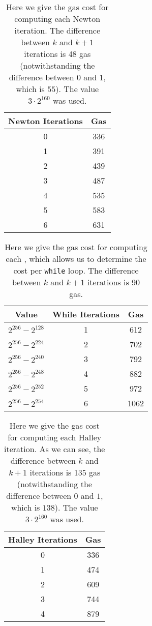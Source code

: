 \begin{table}[p]
\centering
\begin{tabular}{|c|S[table-format=3.0]|}
\hline
Newton Iterations & Gas \\
 & 336 \\
1 & 391 \\
2 & 439 \\
3 & 487 \\
4 & 535 \\
5 & 583 \\
6 & 631 \\
\hline
\end{tabular}
\caption[Newton Iteration Gas Costs]{Here we give
    the gas cost for computing each Newton iteration.
    The difference between $k$ and $k+1$ iterations is 48 gas
    (notwithstanding the difference between $0$ and $1$,
    which is $55$).
    The value $3\cdot2^{160}$ was used.
    }
\label{table:newton_iteration_gas_costs}
\end{table}

\begin{table}[p]
\centering
\begin{tabular}{|c|c|S[table-format=4.0]|}
\hline
Value & While Iterations & Gas \\
\hline
$2^{256} - 2^{128}$ & 1 &  612 \\
$2^{256} - 2^{224}$ & 2 &  702 \\
$2^{256} - 2^{240}$ & 3 &  792 \\
$2^{256} - 2^{248}$ & 4 &  882 \\
$2^{256} - 2^{252}$ & 5 &  972 \\
$2^{256} - 2^{254}$ & 6 & 1062 \\
\hline
\end{tabular}
\caption[While Iteration Gas Costs]{Here we give
    the gas cost for computing each \WhileTwo{},
    which allows us to determine the cost per \texttt{while} loop.
    The difference between $k$ and $k+1$ iterations is 90 gas.
    }
\label{table:while_iteration_gas_costs}
\end{table}

\begin{table}[p]
\centering
\begin{tabular}{|c|S[table-format=3.0]|}
\hline
Halley Iterations & Gas \\
 & 336 \\
1 & 474 \\
2 & 609 \\
3 & 744 \\
4 & 879 \\
\hline
\end{tabular}
\caption[Halley Iteration Gas Costs]{Here we give
    the gas cost for computing each Halley iteration.
    As we can see, the difference between $k$ and $k+1$ iterations is 135 gas
    (notwithstanding the difference between $0$ and $1$,
    which is $138$).
    The value $3\cdot2^{160}$ was used.
    }
\label{table:halley_iteration_gas_costs}
\end{table}

